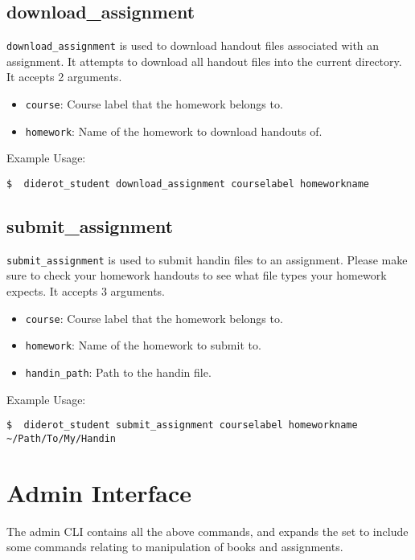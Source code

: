 \subsection{download\_assignment}

\verb|download_assignment| is used to download handout files associated with an assignment.
%
It attempts to download all handout files into the current directory.
% 
It accepts 2 arguments.

\begin{itemize}
  \item \verb|course|: Course label that the homework belongs to.
  \item \verb|homework|: Name of the homework to download handouts of.
\end{itemize}

Example Usage:
\begin{verbatim}
$  diderot_student download_assignment courselabel homeworkname
\end{verbatim}

\subsection{submit\_assignment}

\verb|submit_assignment| is used to submit handin files to an assignment.
%
Please make sure to check your homework handouts to see what file types
your homework expects.
%
It accepts 3 arguments.

\begin{itemize}
  \item \verb|course|: Course label that the homework belongs to.
  \item \verb|homework|: Name of the homework to submit to.
  \item \verb|handin_path|: Path to the handin file.
\end{itemize}

Example Usage:
\begin{verbatim}
$  diderot_student submit_assignment courselabel homeworkname ~/Path/To/My/Handin
\end{verbatim}

\section{Admin Interface}

The admin CLI contains all the above commands, and expands the set to include
some commands relating to manipulation of books and assignments.

